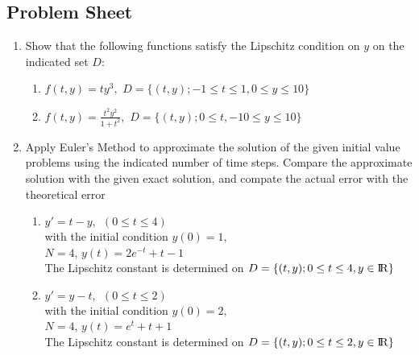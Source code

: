 \subsection{Problem Sheet}
\begin{enumerate}
\item
Show that the following functions satisfy the Lipschitz condition on $y$ on the indicated set $D$:
\begin{enumerate}
\item
$f(t,y)=ty^3,$  $D=\{(t,y);-1\leq t \leq 1, 0\leq y \leq 10\}$
\item 
$f(t,y)=\frac{t^2y^2}{1+t^2},$  $D=\{(t,y);0\leq t, -10\leq y \leq 10 \}$

\end{enumerate}
\item
Apply Euler's Method to approximate the solution of the given initial value problems using the indicated number of time steps. Compare the approximate solution with the given exact solution, and compate the actual error with the theoretical error
\begin{enumerate}
\item
$y'=t-y, \ \ (0\leq t \leq 4)$\\
with the initial condition $y(0)=1,$\\
$N=4$, 
$y(t)=2e^{-t}+t-1$\\

The Lipschitz constant is determined on  $D=\{(t,y);0\leq t \leq 4, y\in \rm I\!R \}$
\item 
$y'=y-t, \ \ (0\leq t \leq 2)$\\
with the initial condition $y(0)=2,$\\
$N=4$, 
$y(t)=e^{t}+t+1$\\

The Lipschitz constant is determined on  $D=\{(t,y);0\leq t \leq 2, y\in \rm I\!R \}$
\end{enumerate}

\end{enumerate}
\newpage